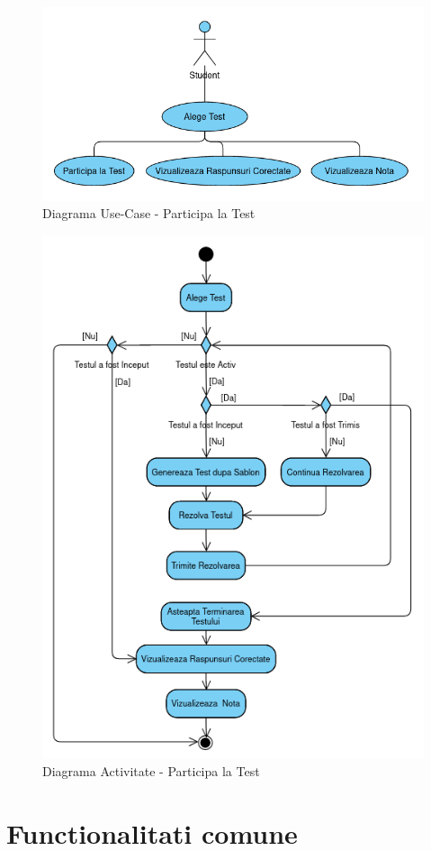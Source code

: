 \documentclass[12pt, a4paper, oneside, romanian]{teza-upb}
\begin{document}
\begin{figure}[H]
\centering
\includegraphics*[width=0.75\columnwidth]{diagrama-use-case-participa-la-test}
\caption{Diagrama Use-Case - Participa la Test}
\label{diagrama-use-case-participa-la-test}
\end{figure}


\begin{figure}[H]
\centering
\includegraphics*[width=0.75\columnwidth]{diagrama-activitate-participa-la-test}
\caption{Diagrama Activitate - Participa la Test}
\label{diagrama-activitate-participa-la-test}
\end{figure}

\section{Functionalitati comune}
\end{document}
